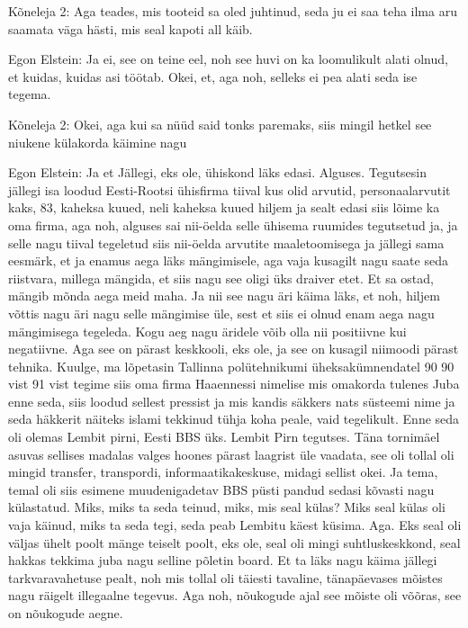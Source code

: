 Kõneleja 2:
Aga teades, mis tooteid sa oled juhtinud, seda ju ei saa teha ilma aru saamata väga hästi, mis seal kapoti all käib.
                 
Egon Elstein:
Ja ei, see on teine eel, noh see huvi on ka loomulikult alati olnud, et kuidas, kuidas asi töötab. Okei, et, aga noh, selleks ei pea alati seda ise tegema.
                 
Kõneleja 2:
Okei, aga kui sa nüüd said tonks paremaks, siis mingil hetkel see niukene külakorda käimine nagu
                 
Egon Elstein:
Ja et
Jällegi, eks ole, ühiskond läks edasi. Alguses.
Tegutsesin jällegi isa loodud Eesti-Rootsi ühisfirma tiival kus olid arvutid, personaalarvutit kaks, 83, kaheksa kuued, neli kaheksa kuued hiljem ja sealt edasi siis lõime ka oma firma, aga noh, alguses sai nii-öelda selle ühisema ruumides tegutsetud ja, ja selle nagu tiival tegeletud siis nii-öelda arvutite maaletoomisega ja jällegi sama eesmärk, et ja enamus aega läks mängimisele, aga vaja kusagilt nagu saate seda riistvara, millega mängida, et siis nagu see oligi üks draiver etet. Et sa ostad, mängib mõnda aega meid maha. Ja nii see nagu äri käima läks, et noh, hiljem võttis nagu äri nagu selle mängimise üle, sest et siis ei olnud enam aega nagu mängimisega tegeleda. Kogu aeg nagu äridele võib olla nii positiivne kui negatiivne. Aga see on pärast keskkooli, eks ole, ja see on kusagil niimoodi pärast tehnika. Kuulge, ma lõpetasin Tallinna polütehnikumi üheksakümnendatel 90 90 vist 91 vist tegime siis oma firma Haaennessi nimelise mis omakorda tulenes
Juba enne seda, siis loodud sellest pressist ja mis kandis säkkers nats süsteemi nime ja seda häkkerit näiteks islami tekkinud tühja koha peale, vaid tegelikult. Enne seda oli olemas Lembit pirni, Eesti BBS üks. Lembit Pirn tegutses.
Täna tornimäel asuvas sellises madalas valges hoones pärast laagrist üle vaadata, see oli tollal oli mingid transfer, transpordi, informaatikakeskuse, midagi sellist okei. Ja tema, temal oli siis esimene muudenigadetav BBS püsti pandud sedasi kõvasti nagu külastatud. Miks, miks ta seda teinud, miks, mis seal külas?
Miks seal külas oli vaja käinud, miks ta seda tegi, seda peab Lembitu käest küsima. Aga.
Eks seal oli väljas ühelt poolt mänge teiselt poolt, eks ole, seal oli mingi suhtluskeskkond, seal hakkas tekkima juba nagu selline põletin board. Et ta läks nagu käima jällegi tarkvaravahetuse pealt, noh mis tollal oli täiesti tavaline, tänapäevases mõistes nagu räigelt illegaalne tegevus. Aga noh, nõukogude ajal see mõiste oli võõras, see on nõukogude aegne.
                 
